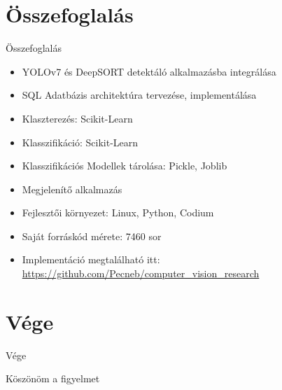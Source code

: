 \documentclass{beamer}
\begin{document}
\section{Összefoglalás}
\begin{frame}{Összefoglalás}
    \begin{itemize}
        \item YOLOv7 és DeepSORT detektáló alkalmazásba integrálása
        \item SQL Adatbázis architektúra tervezése, implementálása
        \item Klaszterezés: Scikit-Learn
        \item Klasszifikáció: Scikit-Learn
        \item Klasszifikációs Modellek tárolása: Pickle, Joblib
        \item Megjelenítő alkalmazás
        \item Fejlesztői környezet: Linux, Python, Codium
        \item Saját forráskód mérete: 7460 sor
        \item Implementáció megtalálható itt: \url{https://github.com/Pecneb/computer_vision_research}
    \end{itemize}
\end{frame}

\section{Vége}
\begin{frame}{Vége}
    \begin{center}\huge{Köszönöm a figyelmet}\end{center}
    \centering
\end{frame}
\end{document}

